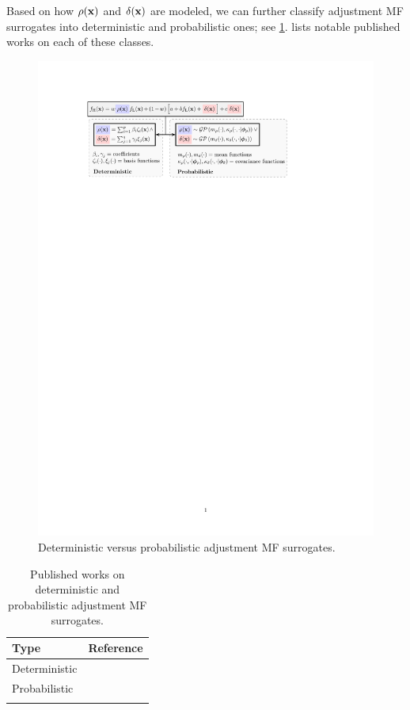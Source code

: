\documentclass[journal ]{new-aiaa}
\begin{document}
Based on how $\rho({\bf {x}})$ and $\delta({\bf{x}})$ are modeled, we can further classify adjustment MF surrogates into deterministic and probabilistic ones; see \cref{Fig-4}.
 lists notable published works on each of these classes.

\begin{figure}
	\centering
	\includegraphics[scale=0.92]{Fig4.pdf}
	\caption{Deterministic versus probabilistic adjustment MF surrogates.}
	\label{Fig-4}
\end{figure}

\begin{table}
	\caption{Published works on deterministic and probabilistic adjustment MF surrogates.}
	\label{Table2}
	\centering
	\begin{tabularx}{\textwidth}{lX}
		\hline \noalign{\smallskip}
		Type & Reference\\
		\hline \noalign{\smallskip}
		Deterministic & \citet{ZhangYiming2018,FernandezGodino2019,Song2019,Kou2019,Durantin2017,Han2013,Tyan2015,Nguyen2015,Palar2016,LiuB2016,LYan2019,Rumpfkeil2017,Rumpfkeil2019,Wang2021}  \\
		\noalign{\smallskip}
		Probabilistic &    \citet{Kennedy2000,Forrester2007,Xiong2008,Kuya2011,Toal2011,Han2012,Keane2012,Goh2013,Park2017,Serani2019,Qian2008,Gratiet2013,Gratiet2014,Allaire2014,Parussini2017,Zhou2017kbs,Xiao2018,Ji2023}\\
		\hline \noalign{\smallskip}
	\end{tabularx}
\end{table}
\end{document}
